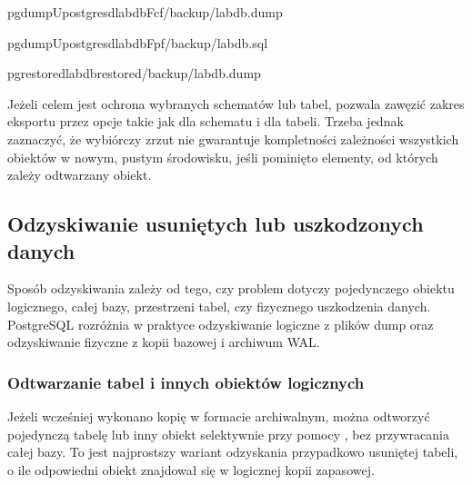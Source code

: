 \documentclass[letterpaper,10pt,polish]{sphinxmanual}
\begin{document}
\begin{sphinxVerbatim}[commandchars=\\\{\}]
pg\PYGZus{}dump\PYGZhy{}Upostgres\PYGZhy{}dlabdb\PYGZhy{}Fc\PYGZhy{}f/backup/labdb.dump

pg\PYGZus{}dump\PYGZhy{}Upostgres\PYGZhy{}dlabdb\PYGZhy{}Fp\PYGZhy{}f/backup/labdb.sql

pg\PYGZus{}restore\PYGZhy{}dlabdb\PYGZus{}restored/backup/labdb.dump
\end{sphinxVerbatim}

\sphinxAtStartPar
Jeżeli celem jest ochrona wybranych schematów lub tabel,  pozwala zawęzić zakres eksportu przez opcje takie jak  dla schematu i  dla tabeli. Trzeba jednak zaznaczyć, że wybiórczy zrzut nie gwarantuje kompletności zależności wszystkich obiektów w nowym, pustym środowisku, jeśli pominięto elementy, od których zależy odtwarzany obiekt.


\subsection{Odzyskiwanie usuniętych lub uszkodzonych danych}
\label{\detokenize{rozdzia_u0142_2/rozdzia_u0142_28/index:odzyskiwanie-usunietych-lub-uszkodzonych-danych}}
\sphinxAtStartPar
Sposób odzyskiwania zależy od tego, czy problem dotyczy pojedynczego obiektu logicznego, całej bazy, przestrzeni tabel, czy fizycznego uszkodzenia danych. PostgreSQL rozróżnia w praktyce odzyskiwanie logiczne z plików dump oraz odzyskiwanie fizyczne z kopii bazowej i archiwum WAL.


\subsubsection{Odtwarzanie tabel i innych obiektów logicznych}
\label{\detokenize{rozdzia_u0142_2/rozdzia_u0142_28/index:odtwarzanie-tabel-i-innych-obiektow-logicznych}}
\sphinxAtStartPar
Jeżeli wcześniej wykonano kopię  w formacie archiwalnym, można odtworzyć pojedynczą tabelę lub inny obiekt selektywnie przy pomocy , bez przywracania całej bazy. To jest najprostszy wariant odzyskania przypadkowo usuniętej tabeli, o ile odpowiedni obiekt znajdował się w logicznej kopii zapasowej.
\end{document}
